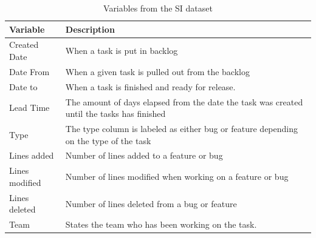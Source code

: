 \documentclass[UKenglish]{ifimaster}  %
\begin{document}
\begin{table}[!ht]
\begin{center}
    \begin{tabular}{| l | p{5cm} |}
    \hline
     \bf{Variable} & \bf{Description}\\ \hline
     Created Date & When a task is put in backlog \\ \hline
     Date From & When a given task is pulled out from the backlog\\ \hline
     Date to & When a task is finished and ready for release. \\ \hline
    Lead Time & The amount of days elapsed from the date the task was created until the tasks has finished  \\ \hline
   Type & The type column is labeled as either bug or feature depending on the type of the task \\ \hline
   Lines added & Number of lines added to a feature or bug \\ \hline
   Lines modified & Number of lines modified when working on a feature or bug \\ \hline
   Lines deleted & Number of lines deleted from a bug or feature \\
    \hline
    Team &States the team who has been working on the task.\\ \hline
    \end{tabular}
\caption{Variables from the SI dataset}
\label{IC} %
\end{center}
\end{table}

\newpage
\end{document}
